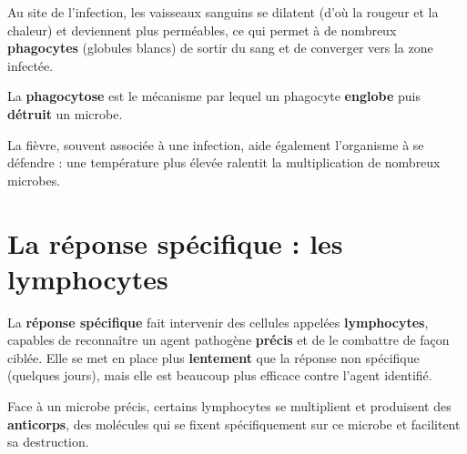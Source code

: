 \begin{propriete}[Mécanisme]
Au site de l'infection, les vaisseaux sanguins se dilatent (d'où la rougeur et la
chaleur) et deviennent plus perméables, ce qui permet à de nombreux \textbf{phagocytes}
(globules blancs) de sortir du sang et de converger vers la zone infectée.
\end{propriete}

\begin{definition}[Phagocytose]
La \textbf{phagocytose} est le mécanisme par lequel un phagocyte \textbf{englobe} puis
\textbf{détruit} un microbe.
\end{definition}

\begin{illus}
\end{illus}

\begin{remarque}
La fièvre, souvent associée à une infection, aide également l'organisme à se défendre :
une température plus élevée ralentit la multiplication de nombreux microbes.
\end{remarque}

\section{La réponse spécifique : les lymphocytes}

\begin{definition}
La \textbf{réponse spécifique} fait intervenir des cellules appelées
\textbf{lymphocytes}, capables de reconnaître un agent pathogène \textbf{précis} et de
le combattre de façon ciblée. Elle se met en place plus \textbf{lentement} que la
réponse non spécifique (quelques jours), mais elle est beaucoup plus efficace contre
l'agent identifié.
\end{definition}

\begin{propriete}
Face à un microbe précis, certains lymphocytes se multiplient et produisent des
\textbf{anticorps}, des molécules qui se fixent spécifiquement sur ce microbe et
facilitent sa destruction.
\end{propriete}

